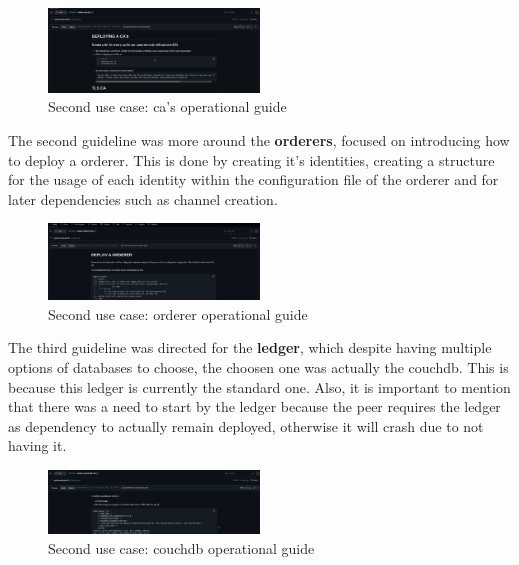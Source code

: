 \begin{figure}[H]
    \centering
    \includegraphics[width=0.5\textwidth]{assets/use-case-2/notes-cas.png} %
    \caption{Second use case: ca's operational guide}
    \label{fig:sample-image} 
\end{figure}

The second guideline was more around the \textbf{orderers}, focused on introducing how to deploy a orderer. This is done by creating 
it's identities, creating a structure for the usage of each identity within the configuration file of the orderer and for later dependencies 
such as channel creation.

\begin{figure}[H]
    \centering
    \includegraphics[width=0.5\textwidth]{assets/use-case-2/notes-orderer.png} %
    \caption{Second use case: orderer operational guide}
    \label{fig:sample-image} 
\end{figure}

The third guideline was directed for the \textbf{ledger}, which despite having multiple options of databases to choose, the choosen one was
actually the couchdb. This is because this ledger is currently the standard one. Also, it is important to mention that there was 
a need to start by the ledger because the peer requires the ledger as dependency to actually remain deployed, otherwise it will crash due 
to not having it.

\begin{figure}[H]
    \centering
    \includegraphics[width=0.5\textwidth]{assets/use-case-2/notes-couch.png} %
    \caption{Second use case: couchdb operational guide}
    \label{fig:sample-image} 
\end{figure}

